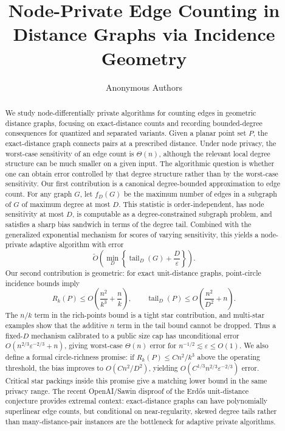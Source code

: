 \documentclass[11pt]{article}
\title{Node-Private Edge Counting in Distance Graphs via Incidence Geometry}
\author{Anonymous Authors}
\date{}
\newcommand{\eps}{\varepsilon}
\newcommand{\tail}{\operatorname{tail}}
\begin{document}
\begin{titlepage}
\maketitle

\begin{abstract}
We study node-differentially private algorithms for counting edges in geometric distance graphs, focusing on exact-distance counts and recording bounded-degree consequences for quantized and separated variants. Given a planar point set \(P\), the exact-distance graph connects pairs at a prescribed distance. Under node privacy, the worst-case sensitivity of an edge count is \(\Theta(n)\), although the relevant local degree structure can be much smaller on a given input. The algorithmic question is whether one can obtain error controlled by that degree structure rather than by the worst-case sensitivity. Our first contribution is a canonical degree-bounded approximation to edge count. For any graph \(G\), let \(f_D(G)\) be the maximum number of edges in a subgraph of \(G\) of maximum degree at most \(D\). This statistic is order-independent, has node sensitivity at most \(D\), is computable as a degree-constrained subgraph problem, and satisfies a sharp bias sandwich in terms of the degree tail. Combined with the generalized exponential mechanism for scores of varying sensitivity, this yields a node-private adaptive algorithm with error
\[
  \widetilde O\!\left(\min_D \left\{\tail_D(G)+\frac{D}{\eps}\right\}\right).
\]
Our second contribution is geometric: for exact unit-distance graphs, point-circle incidence bounds imply
\[
R_k(P) \le O\!\left(\frac{n^2}{k^3}+\frac{n}{k}\right),
\qquad
\tail_D(P) \le O\!\left(\frac{n^2}{D^2}+n\right).
\]
The \(n/k\) term in the rich-points bound is a tight star contribution, and multi-star examples show that the additive \(n\) term in the tail bound cannot be dropped. Thus a fixed-\(D\) mechanism calibrated to a public size cap has unconditional error \(O(n^{2/3}\eps^{-2/3}+n)\), giving worst-case \(\Theta(n)\) error for \(n^{-1/2}\lesssim\eps\le O(1)\). We also define a formal circle-richness promise: if \(R_k(P)\le Cn^2/k^3\) above the operating threshold, the bias improves to \(O(Cn^2/D^2)\), yielding \(O(C^{1/3}n^{2/3}\eps^{-2/3})\) error. Critical star packings inside this promise give a matching lower bound in the same privacy range. The recent OpenAI/Sawin disproof of the Erd\H{o}s unit-distance conjecture provides extremal context: exact-distance graphs can have polynomially superlinear edge counts, but conditional on near-regularity, skewed degree tails rather than many-distance-pair instances are the bottleneck for adaptive private algorithms.
\end{abstract}
\end{titlepage}
\end{document}

